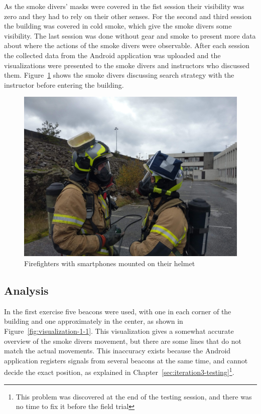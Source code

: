 \documentclass[../Main/thesis.tex]{subfiles}
\begin{document}
As the smoke divers' masks were covered in the fist session their visibility was zero and they had to rely on their other senses.
For the second and third session the building was covered in cold smoke, which give the smoke divers some visibility.
The last session was done without gear and smoke to present more data about where the actions of the smoke divers were observable.
After each session the collected data from the Android application was uploaded and the visualizations were presented to the smoke divers and instructors who discussed them.
Figure~\ref{fig:eval-firefighters} shows the smoke divers discussing search strategy with the instructor before entering the building.

\begin{figure}[h]
	\centering
	\includegraphics[width=\textwidth]{../fig/firefighters-with-helmet}
	\caption{Firefighters with smartphones mounted on their helmet}
	\label{fig:eval-firefighters}
\end{figure}

\subsection{Analysis}
In the first exercise five beacons were used, with one in each corner of the building and one approximately in the center, as shown in Figure~\ref{fig:visualization-1-1}.
This visualization gives a somewhat accurate overview of the smoke divers movement, but there are some lines that do not match the actual movements.
This inaccuracy exists because the Android application registers signals from several beacons at the same time, and cannot decide the exact position, as explained in Chapter~\ref{sec:iteration3-testing}\footnote{This problem was discovered at the end of the testing session, and there was no time to fix it before the field trial}.
\end{document}
